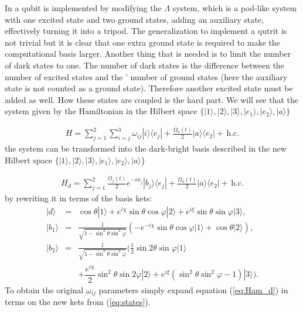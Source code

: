 \documentclass[pra,showpacs,priprent,twocolumn,superscriptaddress]{revtex4-1}
\newcommand{\ket}[1]{|#1\rangle}
\newcommand{\bra}[1]{\langle #1|}
\begin{document}
In \cite{ai22} a qubit is implemented by modifying the $\Lambda$ system, which is a 
pod-like system with one excited state and two ground states, adding an auxiliary state, 
effectively turning it into a tripod. The generalization to implement a qutrit is not trivial 
but it is clear that one extra ground state is required to make the computational basis 
larger. Another thing that is needed is to limit the number of dark states to one. The 
number of dark states is the difference between the number of excited states and the '
number of ground states \cite{shkolnikov20} (here the auxiliary state is not counted as 
a ground state). Therefore another excited state must be added as well. How these states are 
coupled is the hard part. We will see that the system given by the Hamiltonian in the Hilbert space $\{\ket{1},\ket{2},\ket{3},\ket{e_1},\ket{e_2},\ket{a}\}$

\begin{eqnarray}
\label{eq:Ham}
H = \sum_{j = 1}^2 \sum_{i =j}^{3} \omega_{ij}\ket{i}\bra{e_j}  + \frac{\Omega_{a}(t)}{2}\ket{a}\bra{e_2}  +\,\text{h.c.}
\end{eqnarray}
the system can be transformed into the dark-bright basis described in the new Hilbert space $\{\ket{1},\ket{2},\ket{3},\ket{e_1},\ket{e_2},\ket{a}\}$


\begin{eqnarray}
\label{eq:Ham_d}
H_d = \sum_{j = 1}^2 \frac{\Omega_j(t)}{2}e^{-i\phi_j}\ket{b_j}\bra{e_j}  + \frac{\Omega_a(t)}{2}\ket{a}\bra{e_2}  +\,\text{h.c.}
\end{eqnarray}
by rewriting it in terms of the basis kets:
\begin{eqnarray}
\label{eq:states}
\ket{d} & = & \cos\theta\ket{1} + e^{i\chi}\sin\theta\cos\varphi\ket{2} + 
e^{i\xi}\sin\theta\sin\varphi\ket{3},
\nonumber \\
\ket{b_1} & = & \frac{1}{\sqrt{1-\sin^2\theta\sin^2\varphi}} 
\left(-e^{-i\chi}\sin\theta\cos\varphi\ket{1} + \cos\theta\ket{2} \right),
\nonumber \\
\ket{b_2} & = & \frac{1}{\sqrt{1-\sin^2\theta\sin^2\varphi}} 
\bigg(\frac{1}{2}\sin 2\theta\sin\varphi\ket{1} 
\nonumber \\ 
 & & + \dfrac{e^{i\chi}}{2}\sin^2\theta\sin 2\varphi\ket{2} + 
 e^{i\xi}(\sin^2\theta\sin^2\varphi - 1)\ket{3}\bigg).
\end{eqnarray}
To obtain the original $\omega_{ij}$ parameters simply expand equation (\ref{eq:Ham_d}) in terms on the new kets from (\ref{eq:states}).
\end{document}
